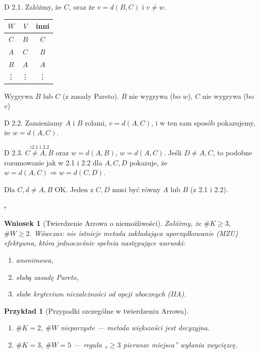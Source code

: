 \documentclass[12pt,a4paper]{article}
\theoremstyle{break}
\newtheorem{wniosek}{Wniosek}[theorem]
\newtheorem{example}{Przykład}[section]
\begin{document}
\begin{enumerate}[Dow. I)]
			D 2.1. Załóżmy, że $C$, oraz że $v = d(B,C)$ i $v \neq w$. 	
			\begin{tabular}{|c|c|c|}\hline
				$W$ & $V$ & inni \\\hline
				$C$ & $B$ & $C$ \\\hline
				$A$ & $C$ & $B$ \\\hline
				$B$ & $A$ & $A$ \\\hline
				\vdots & \vdots & \vdots \\\hline
			\end{tabular}
			
			Wygrywa $B$ lub $C$ (z zasady Pareto). $B$ nie wygrywa (bo $w$), $C$ nie wygrywa (bo $v$) \faBolt
			
			D 2.2. Zamieniamy $A$ i $B$ rolami, $v = d(A,C)$, i w ten sam sposób pokazujemy, że $w = d(A,C)$.
			
			D 2.3. $\overset{z 2.1 \text{ i } 2.2}{C \neq A,B}$ oraz $w = d(A,B)$, $w = d(A,C)$. Jeśli $D \neq A,C$, to podobne rozumowanie jak w 2.1 i 2.2 dla $A,C,D$ pokazuje, że $w = d(A,C) \Rightarrow w = d(C,D)$.
			
			Dla $C,d \neq A,B$ OK.
			Jeden z $C,D$ musi być równy $A$ lub $B$ (z 2.1 i 2.2).
			
		\end{enumerate}
	
\begin{flushright}$\square$\end{flushright}
\begin{wniosek}[Twierdzenie Arrowa o niemożliwości]
	Załóżmy, że $\# K \geq 3$, $\# W \geq 2$. Wówczas: nie istnieje metoda zakładająca uporządkowanie (MZU) efektywna, która jednocześnie spełnia następujące warunki:
	\begin{enumerate}[-]
		\item anonimowa,
		\item słabą zasadę Pareto,
		\item słabe kryterium niezależności od opcji ubocznych (IIA).
	\end{enumerate}
\end{wniosek}

\begin{example}[Przypadki szczególne w twierdzeniu Arrowa]
	\begin{enumerate}[1.]
		\item $\# K = 2$, $\# W$ nieparzyste — metoda większości jest decyzyjna.
		\item $\# K = 3$, $\# W = 5$ — reguła „$\geq 3$ pierwsze miejsca” wyłania zwycięzcę.
	\end{enumerate}
\end{example}
\end{document}
